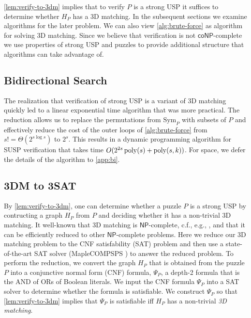 \documentclass[11pt]{article}
\newcommand\Sym[1]{\ensuremath{\mathrm{Sym}_{#1}}}
\renewcommand\NP{\ensuremath{\mathsf{NP}}}
\newcommand\coNP{\ensuremath{\mathsf{coNP}}}
\begin{document}
\autoref{lem:verify-to-3dm} implies that to verify $P$ is a strong USP
it suffices to determine whether $H_P$ has a 3D matching.  In the
subsequent sections we examine algorithms for the later problem.  We
can also view \autoref{alg:brute-force} as algorithm for solving 3D
matching.  Since we believe that verification is not \coNP-complete we
use properties of strong USP and puzzles to provide additional
structure that algorithms can take advantage of.


\subsection{Bidirectional Search}

The realization that verification of strong USP is a variant of 3D
matching quickly led to a linear exponential time algorithm that was
more practical.  The reduction allows us to replace the permutations
from $\Sym{P}$ with subsets of $P$ and effectively reduce the cost of
the outer loops of \autoref{alg:brute-force} from $s! =
\Theta(2^{s\log s})$ to $2^s$.  This results in a dynamic programming
algorithm for SUSP verification that takes time $O(2^{2s} \operatorname{poly}(s) +
\operatorname{poly}(s,k))$.  For space, we defer the details of the algorithm to
\autoref{app:bi}.

\subsection{3DM to 3SAT}
\label{subsec:sat}

By \autoref{lem:verify-to-3dm}, one can determine whether a puzzle $P$
is a strong USP by contructing a graph $H_P$ from $P$ and deciding
whether it has a non-trivial 3D matching.  It well-known that 3D
matching is \NP{}-complete, c.f., e.g., \cite{gj79}, and that it can be
efficiently reduced to other \NP{}-complete problems. Here we reduce
our 3D matching problem to the CNF satisfability (SAT) problem and
then use a state-of-the-art SAT solver (MapleCOMPSPS \cite{lgpc16}) to
answer the reduced problem. To perform the reduction, we convert the
graph $H_P$ that is obtained from the puzzle $P$ into a conjunctive
normal form (CNF) formula, $\Psi_P$, a depth-2 formula that is the AND
of ORs of Boolean literals.  We input the CNF formula $\Psi_P$ into a
SAT solver to determine whether the formula is satisfiable.  We
construct $\Psi_P$ so that \autoref{lem:verify-to-3dm} implies that
$\Psi_P$ is satisfiable iff $H_P$ has a non-trivial \emph{3D
  matching}.
\end{document}
